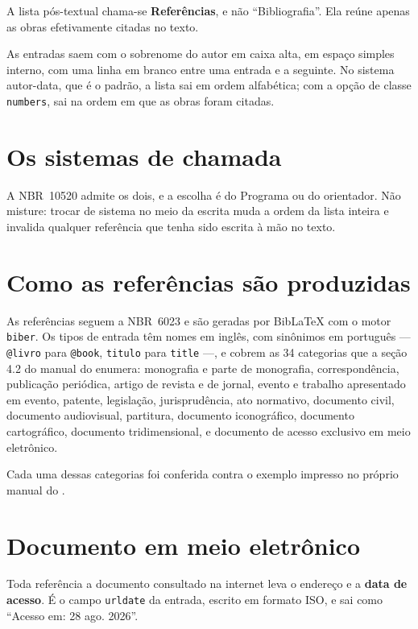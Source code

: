 \documentclass[dsc]{ufrj}
\begin{document}
  A lista pós-textual chama-se \textbf{Referências}, e não ``Bibliografia''. Ela
  reúne apenas as obras efetivamente citadas no texto.

  As entradas saem com o sobrenome do autor em caixa alta, em espaço simples
  interno, com uma linha em branco entre uma entrada e a seguinte. No sistema
  autor-data, que é o padrão, a lista sai em ordem alfabética; com a opção de
  classe \verb|numbers|, sai na ordem em que as obras foram citadas.

  \section{Os sistemas de chamada}

  A \mbox{NBR~10520} admite os dois, e a escolha é do Programa ou do orientador.
  Não misture: trocar de sistema no meio da escrita muda a ordem da lista inteira
  e invalida qualquer referência que tenha sido escrita à mão no texto.

  \section{Como as referências são produzidas}

  As referências seguem a \mbox{NBR~6023} e são geradas por BibLaTeX com o motor
  \texttt{biber}. Os tipos de entrada têm nomes em inglês, com sinônimos em
  português --- \verb|@livro| para \verb|@book|, \verb|titulo| para
  \verb|title| ---, e cobrem as 34 categorias que a seção 4.2 do manual do
   enumera: monografia e parte de monografia, correspondência,
  publicação periódica, artigo de revista e de jornal, evento e trabalho
  apresentado em evento, patente, legislação, jurisprudência, ato normativo,
  documento civil, documento audiovisual, partitura, documento iconográfico,
  documento cartográfico, documento tridimensional, e documento de acesso
  exclusivo em meio eletrônico.

  Cada uma dessas categorias foi conferida contra o exemplo impresso no próprio
  manual do .

  \section{Documento em meio eletrônico}

  Toda referência a documento consultado na internet leva o endereço e a
  \textbf{data de acesso}. É o campo \verb|urldate| da entrada, escrito em
  formato ISO, e sai como ``Acesso em: 28 ago. 2026''.
\end{document}
